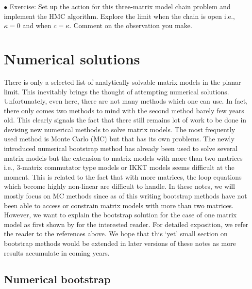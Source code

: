 \documentclass[11pt]{article}
\begin{document}
\begin{mdframed}[backgroundcolor=blue!3] 
	\textsc{} 
	$\bullet$ Exercise:  Set up the action for this three-matrix model chain problem and implement the HMC algorithm. Explore the limit when the chain is open i.e., $\kappa=0$ and when $c = \kappa$. Comment on the observation you make. 
\end{mdframed}



\section{Numerical solutions} 

There is only a selected list of analytically solvable matrix models in the planar limit. This inevitably brings 
the thought of attempting numerical solutions. Unfortunately, even here, there are not many methods 
which one can use. In fact, there only comes two methods to mind with the second method barely few years old. 
This clearly signals the fact that there still remains lot of work to be done in devising new numerical 
methods to solve matrix models. The most frequently used method is Monte Carlo (MC) but that has its own problems. 
The newly introduced numerical bootstrap method has already been used to solve several matrix models \cite{Anderson:2016rcw,Lin:2020mme,Han:2020bkb,Kazakov:2021lel} but the extension to matrix models with more than two matrices i.e., 3-matrix commutator type models or IKKT models seems difficult at the moment. This is related to the fact that with more matrices, the loop equations which become highly non-linear are difficult to handle.
In these notes, we will mostly focus on MC methods since as of this writing bootstrap methods have not been able to access or constrain matrix models with more than two matrices. However, we want to explain the bootstrap solution for the case of one matrix model as first shown by \cite{Lin:2020mme} for the interested reader. For detailed exposition, we refer the reader to the references above. We hope that this `yet' small section on bootstrap methods would be extended in later versions of these notes as more results accumulate in coming years. 

\subsection{Numerical bootstrap}
\end{document}
